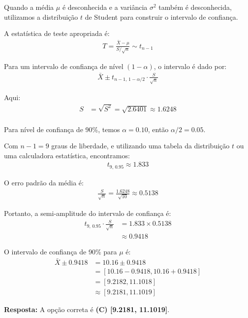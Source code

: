\documentclass[a4paper,12pt]{article}
\begin{document}
\begin{enumerate}
\begin{mdframed}[backgroundcolor=gray!10, linewidth=0pt, innertopmargin=10pt, innerbottommargin=10pt]
    Quando a média $\mu$ é desconhecida e a variância $\sigma^2$ também é desconhecida, utilizamos a distribuição $t$ de Student para construir o intervalo de confiança.

    A estatística de teste apropriada é:
    \begin{align*}
    T = \frac{\bar{X} - \mu}{S/\sqrt{n}} \sim t_{n-1}
    \end{align*}

    Para um intervalo de confiança de nível $(1-\alpha)$, o intervalo é dado por:
    \begin{align*}
    \bar{X} \pm t_{n-1,\,1-\alpha/2} \cdot \frac{S}{\sqrt{n}}
    \end{align*}

    Aqui:
    \begin{align*}
    S &= \sqrt{S^2} = \sqrt{2.6401} \approx 1.6248 \\
    \end{align*}

    Para nível de confiança de 90\%, temos $\alpha = 0.10$, então $\alpha/2 = 0.05$.
    
    Com $n-1 = 9$ graus de liberdade, e utilizando uma tabela da distribuição $t$ ou uma calculadora estatística, encontramos:
    \begin{align*}
    t_{9,\,0.95} \approx 1.833
    \end{align*}

    O erro padrão da média é:
    \begin{align*}
    \frac{S}{\sqrt{n}} = \frac{1.6248}{\sqrt{10}} \approx 0.5138
    \end{align*}

    Portanto, a semi-amplitude do intervalo de confiança é:
    \begin{align*}
    t_{9,\,0.95} \cdot \frac{S}{\sqrt{n}} &= 1.833 \times 0.5138 \\
    &\approx 0.9418
    \end{align*}

    O intervalo de confiança de 90\% para $\mu$ é:
    \begin{align*}
    \bar{X} \pm 0.9418 &= 10.16 \pm 0.9418 \\
    &= [10.16 - 0.9418, 10.16 + 0.9418] \\
    &= [9.2182, 11.1018] \\
    &\approx [9.2181, 11.1019]
    \end{align*}

    \textbf{Resposta:} A opção correta é \textbf{(C) [9.2181, 11.1019]}.
    \end{mdframed}


\end{enumerate}
\end{document}
